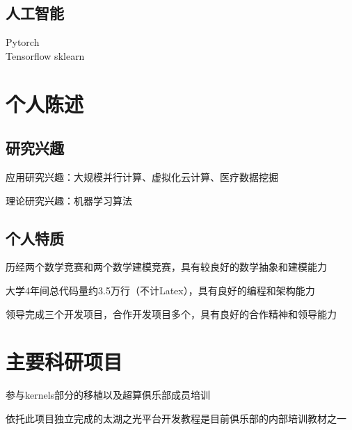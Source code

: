 \documentclass[]{deedy-resume-openfont}
\begin{document}
\begin{minipage}[t]{0.25\textwidth}
	\subsection{人工智能}
	Pytorch \\
	Tensorflow \textbullet{} sklearn \\
    \sectionsep

\end{minipage}
\hfill
\begin{minipage}[t]{0.73\textwidth}
    \section{个人陈述}
    \subsection{研究兴趣}
    \vspace{\topsep}
	\begin{tightemize}
		\item 应用研究兴趣：大规模并行计算、虚拟化云计算、医疗数据挖掘
		\item 理论研究兴趣：机器学习算法
	\end{tightemize}
    \subsection{个人特质}
    \vspace{\topsep}
    \begin{tightemize}
        \item 历经两个数学竞赛和两个数学建模竞赛，具有较良好的数学抽象和建模能力
		\item 大学4年间总代码量约3.5万行（不计Latex），具有良好的编程和架构能力
		\item 领导完成三个开发项目，合作开发项目多个，具有良好的合作精神和领导能力
	\end{tightemize}
    \sectionsep

	

	\section{主要科研项目}
	\descript{}
	\begin{tightemize}
		\item 参与kernels部分的移植以及超算俱乐部成员培训
		\item 依托此项目独立完成的太湖之光平台开发教程是目前俱乐部的内部培训教材之一
	\end{tightemize}
    \sectionsep


\end{minipage}
\end{document}
